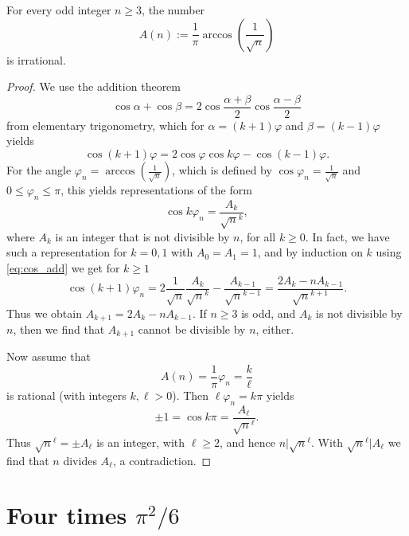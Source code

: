 \begin{theorem}
  \label{arccos_irrational}
  \label{book.irrational.Theorem_3}
  \leanok
  For every odd integer \(n \ge 3\), the number
  \[
  A(n) := \frac{1}{\pi} \arccos \left(\frac{1}{\sqrt{n}}\right)
  \]
  is irrational.
\end{theorem}
\begin{proof}
  We use the addition theorem
  \[
  \cos \alpha + \cos \beta = 2 \cos \frac{\alpha+\beta}{2} \cos \frac{\alpha-\beta}{2}
  \]
  from elementary trigonometry, which for $\alpha = (k+1)\varphi$ and $\beta = (k-1)\varphi$ yields
  \begin{equation} \label{eq:cos_add}
  \cos (k+1)\varphi = 2 \cos \varphi \cos k\varphi - \cos (k-1)\varphi.
  \end{equation}
  For the angle $\varphi_n = \arccos \left(\frac{1}{\sqrt{n}}\right)$, which is defined by $\cos \varphi_n = \frac{1}{\sqrt{n}}$
  and $0 \le \varphi_n \le \pi$, this yields representations of the form
  \[
  \cos k\varphi_n = \frac{A_k}{\sqrt{n}^k},
  \]
  where $A_k$ is an integer that is not divisible by $n$, for all $k \ge 0$.
  In fact, we have such a representation for $k=0, 1$ with $A_0 = A_1 = 1$, and by induction on $k$ using \eqref{eq:cos_add} we get for $k \ge 1$
  \[
  \cos (k+1)\varphi_n = 2 \frac{1}{\sqrt{n}} \frac{A_k}{\sqrt{n}^k} - \frac{A_{k-1}}{\sqrt{n}^{k-1}} = \frac{2A_k - n A_{k-1}}{\sqrt{n}^{k+1}}.
  \]
  Thus we obtain $A_{k+1} = 2A_k - n A_{k-1}$.
  If $n \ge 3$ is odd, and $A_k$ is not divisible by $n$, then we find that $A_{k+1}$ cannot be divisible by $n$, either.

  Now assume that
  \[
  A(n) = \frac{1}{\pi} \varphi_n = \frac{k}{\ell}
  \]
  is rational (with integers $k, \ell > 0$).
  Then $\ell \varphi_n = k \pi$ yields
  \[
  \pm 1 = \cos k \pi = \frac{A_\ell}{\sqrt{n}^\ell}.
  \]
  Thus $\sqrt{n}^\ell = \pm A_\ell$ is an integer, with $\ell \ge 2$, and hence $n | \sqrt{n}^\ell$.
  With $\sqrt{n}^\ell | A_\ell$ we find that $n$ divides $A_\ell$, a contradiction.
\end{proof}


\chapter{Four times $π^2/6$}


